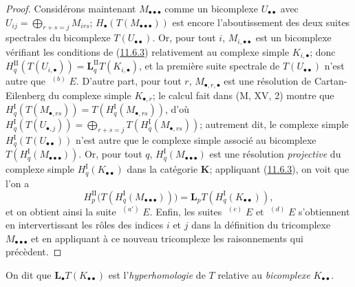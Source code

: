 \begin{proof}
Considérons maintenant $M_{\bullet\bullet\bullet}$ comme un bicomplexe
$U_{\bullet\bullet}$ avec
$U_{ij}=\bigoplus_{r+s=j}M_{irs}$;
$H_\bullet(T(M_{\bullet\bullet\bullet}))$ est encore l'aboutissement des deux
suites spectrales du bicomplexe $T(U_{\bullet\bullet})$. Or, pour tout $i$,
$M_{i,\bullet\bullet}$ est un bicomplexe vérifiant les conditions de
(\hyperref[0.11.6.3-fr]{11.6.3}) relativement au complexe simple
$K_{i,\bullet}$; donc
$H_q^{\mathrm{II}}(T(U_{i,\bullet}))=
\mathbf{L}_q^{\mathrm{II}}T(K_{i,\bullet})$, et la première suite spectrale de
$T(U_{\bullet\bullet})$ n'est autre que $\mathop{}^{(b)}E$. D'autre part, pour
tout $r$, $M_{\bullet,r,\bullet}$ est une résolution de Cartan-Eilenberg du
complexe simple $K_{\bullet,r}$; le calcul fait dans (M, XV, 2) montre que
$H_q^{\mathrm I}(T(M_{\bullet,rs}))=T(H_q^{\mathrm I}(M_{\bullet,rs}))$,
d'où $H_q^{\mathrm I}(T(U_{\bullet,j}))=\bigoplus_{r+s=j}T(H_q^{\mathrm I}(M_{\bullet,rs}))$;
autrement dit, le complexe simple
$H_q^{\mathrm I}(T(U_{\bullet\bullet}))$ n'est autre que le complexe simple
associé au bicomplexe
$T(H_q^{\mathrm I}(M_{\bullet\bullet\bullet}))$. Or, pour tout $q$,
$H_q^{\mathrm I}(M_{\bullet\bullet\bullet})$ est une résolution \emph{projective} du
complexe simple $H_q^{\mathrm I}(K_{\bullet\bullet})$ dans la catégorie
$\boldsymbol{K}$; appliquant (\hyperref[0.11.6.3-fr]{11.6.3}), on voit que l'on a
\[
H_p^{\mathrm{II}}
\bigl(T(H_q^{\mathrm I}(M_{\bullet\bullet\bullet}))\bigr)
=\mathbf{L}_pT(H_q^{\mathrm I}(K_{\bullet\bullet})),
\]
et on obtient ainsi la suite $\mathop{}^{(a')}E$. Enfin, les suites
$\mathop{}^{(c)}E$ et $\mathop{}^{(d)}E$ s'obtiennent en intervertissant les
rôles des indices $i$ et $j$ dans la définition du tricomplexe
$M_{\bullet\bullet\bullet}$ et en appliquant à ce nouveau tricomplexe les
raisonnements qui précèdent.
\end{proof}

On dit que $\mathbf{L}_\bullet T(K_{\bullet\bullet})$ est l'\emph{hyperhomologie} de
$T$ relative au \emph{bicomplexe} $K_{\bullet\bullet}$.


